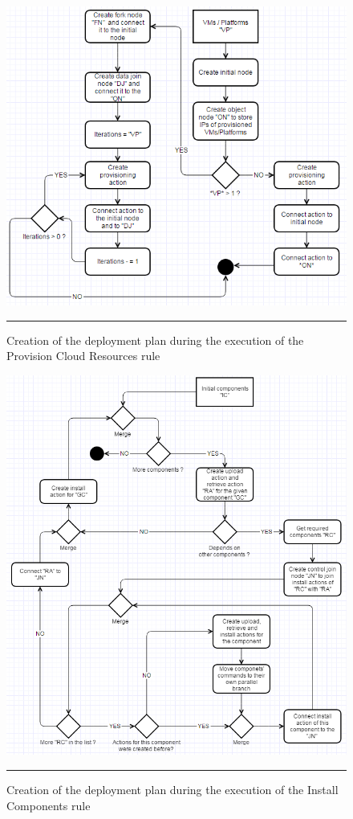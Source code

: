 \begin{figure}[htbp]
	\centering
		\includegraphics[width=38em]{./Figures/Provision_cloud_resources}
		\rule{38em}{0.5pt}
	\caption[Provisioning Rule]{Creation of the deployment plan during the execution of the Provision Cloud Resources rule}
	\label{fig:provision}
\end{figure}

\noindent 


\noindent 

\begin{figure}[htbp]
	\centering
		\includegraphics[width=38em]{./Figures/Install_components}
		\rule{38em}{0.5pt}
	\caption[Installation Rule]{Creation of the deployment plan during the execution of the Install Components rule}
	\label{fig:install_rule}
\end{figure}

